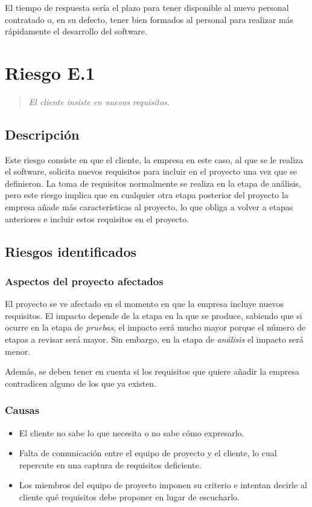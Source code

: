 \documentclass[11pt,a4paper,spanish,twoside]{book}
\begin{document}
El tiempo de respuesta sería el plazo para tener disponible al nuevo
personal contratado o, en su defecto, tener bien formados al personal para
realizar más rápidamente el desarrollo del software.

\section{Riesgo E.1}
\begin{quote}
  \emph{El cliente insiste en nuevos requisitos.}
\end{quote}

\subsection{Descripción}
Este riesgo consiste en que el cliente, la empresa en este caso, al que se le 
realiza el software, solicita nuevos requisitos para incluir en el proyecto 
una vez que se definieron. La toma de requisitos normalmente se realiza en la 
etapa de análisis, pero este riesgo implica que en cualquier otra etapa 
posterior del proyecto la empresa añade más características al proyecto, lo que 
obliga a volver a etapas anteriores e incluir estos requisitos en el
proyecto.

\subsection{Riesgos identificados}
\subsubsection{Aspectos del proyecto afectados}
El proyecto se ve afectado en el momento en que la empresa incluye nuevos
requisitos. El impacto depende de la etapa en la que se produce, sabiendo que 
si ocurre en la etapa de \emph{pruebas}, el impacto será mucho mayor porque
el número de etapas a revisar será mayor. Sin embargo, en la etapa de
\emph{análisis} el impacto será menor. 

Además, se deben tener en cuenta si los requisitos que quiere añadir la
empresa contradicen alguno de los que ya existen. 

\subsubsection{Causas}
\begin{itemize}
\item El cliente no sabe lo que necesita o no sabe cómo expresarlo.
\item Falta de comunicación entre el equipo de proyecto y el cliente, lo cual 
  repercute en una captura de requisitos deficiente.
\item Los miembros del equipo de proyecto imponen su criterio e intentan
  decirle al cliente qué requisitos debe proponer en lugar de escucharlo.
\end{itemize}
\end{document}
